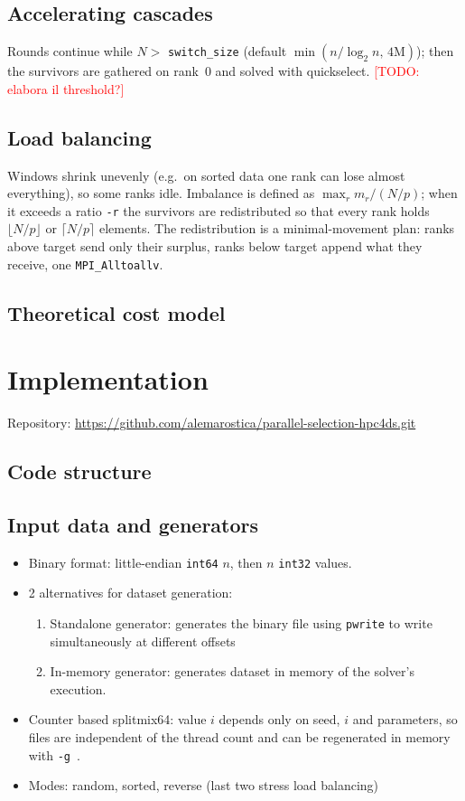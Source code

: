 \documentclass[11pt, titlepage]{article}
\newcommand{\TODO}[1]{\textcolor{red}{[TODO: #1]}}
\begin{document}
\subsection{Accelerating cascades}\label{sec:design:cascade}
Rounds continue while $N>$ \texttt{switch\_size} (default $\min(n/\log_2 n,\,4\mathrm{M})$); then the survivors are gathered on rank~0 and solved with quickselect.
\TODO{elabora il threshold?}

\subsection{Load balancing}\label{sec:design:lb}
Windows shrink unevenly (e.g.\ on sorted data one rank can lose almost everything), so some ranks idle. Imbalance is defined as $\max_r m_r / (N/p)$; when it exceeds a ratio \texttt{-r} the survivors are redistributed so that every rank holds $\lfloor N/p\rfloor$ or $\lceil N/p\rceil$ elements. The redistribution is a minimal-movement plan: ranks above target send only their surplus, ranks below target append what they receive, one \texttt{MPI\_Alltoallv}.

\subsection{Theoretical cost model}


\section{Implementation}\label{sec:impl}

Repository: \url{https://github.com/alemarostica/parallel-selection-hpc4ds.git}

\subsection{Code structure}

\subsection{Input data and generators}
\begin{itemize}
\item Binary format: little-endian \texttt{int64} $n$, then $n$ \texttt{int32} values.
\item 2 alternatives for dataset generation:
  \begin{enumerate}
  \item Standalone generator: generates the binary file using \texttt{pwrite} to write simultaneously at different offsets
  \item In-memory generator: generates dataset in memory of the solver's execution.
  \end{enumerate}
\item Counter based splitmix64: value $i$ depends only on seed, $i$ and parameters, so files are independent of the thread count and can be regenerated in memory with \texttt{-g}~\cite{splitmix}.
\item Modes: random, sorted, reverse (last two stress load balancing)
\end{itemize}
\end{document}
